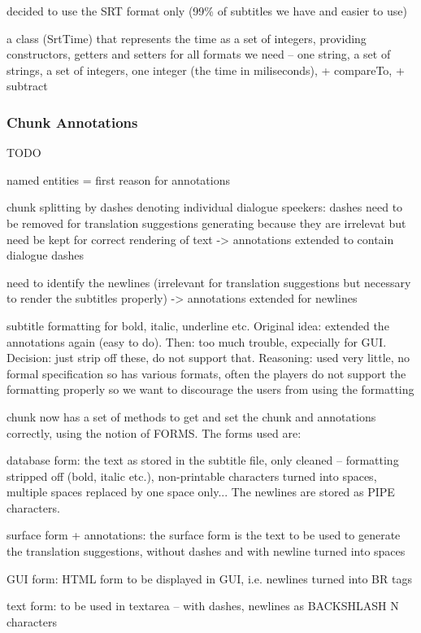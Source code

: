 decided to use the SRT format only (99\% of subtitles we have and easier to use)

a class (SrtTime) that represents the time as a set of integers, providing constructors, getters and setters for all formats we need -- one string, a set of strings, a set of integers, one integer (the time in miliseconds), + compareTo, + subtract

\subsubsection{Chunk Annotations}

TODO

named entities = first reason for annotations

chunk splitting by dashes denoting individual dialogue speekers: dashes need to be removed for translation suggestions generating because they are irrelevat but need be kept for correct rendering of text -> annotations extended to contain dialogue dashes

need to identify the newlines (irrelevant for translation suggestions but necessary to render the subtitles properly) -> annotations extended for newlines

subtitle formatting for bold, italic, underline etc. Original idea: extended the annotations again (easy to do). Then: too much trouble, expecially for GUI. Decision: just strip off these, do not support that. Reasoning: used very little, no formal specification so has various formats, often the players do not support the formatting properly so we want to discourage the users from using the formatting

chunk now has a set of methods to get and set the chunk and annotations correctly, using the notion of FORMS. The forms used are:

database form: the text as stored in the subtitle file, only cleaned -- formatting stripped off (bold, italic etc.), non-printable characters turned into spaces, multiple spaces replaced by one space only... The newlines are stored as PIPE characters.

surface form + annotations: the surface form is the text to be used to generate the translation suggestions, without dashes and with newline turned into spaces

GUI form: HTML form to be displayed in GUI, i.e. newlines turned into BR tags

text form: to be used in textarea -- with dashes, newlines as BACKSHLASH N characters

